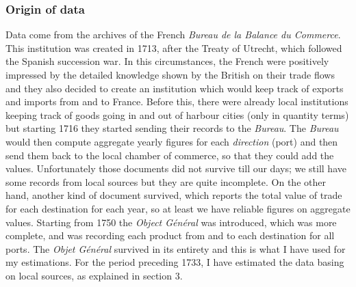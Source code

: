\documentclass[12pt,a4paper,titlepage,english]{article}
\begin{document}
\subsubsection{Origin of data}
Data come from the archives of the French \textit{Bureau de la Balance du Commerce}. This institution was created in 1713, after the Treaty of Utrecht, which followed the Spanish succession war. In this circumstances, the French were positively impressed by the detailed knowledge shown by the British on their trade flows and they also decided to create an institution which would keep track of exports and imports from and to France. Before this, there were already local institutions keeping track of goods going in and out of harbour cities (only in quantity terms) but starting 1716 they started sending their records to the \textit{Bureau}. The \textit{Bureau} would then compute aggregate yearly figures for each \textit{direction} (port) and then send them back to the local chamber of commerce, so that they could add the values. Unfortunately those documents did not survive till our days; we still have some records from local sources but they are quite incomplete. On the other hand, another kind of document survived, which reports the total value of trade for each destination for each year, so at least we have reliable figures on aggregate values. Starting from 1750 the \textit{Object Général} was introduced, which was more complete, and was recording each product from and to each destination for all ports. The \textit{Objet Général} survived in its entirety and this is what I have used for my estimations. For the period preceding 1733, I have estimated the data basing on local sources, as explained in section 3. 
\end{document}

